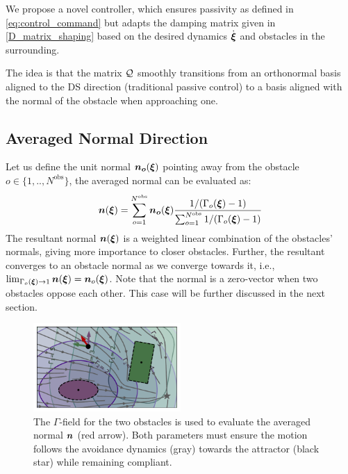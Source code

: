 \documentclass[conference]{IEEEtran}
\begin{document}
We propose a novel controller, which ensures passivity as defined in \eqref{eq:control_command} but adapts the damping matrix given in \eqref{D_matrix_shaping} based on the desired dynamics $\dot{\boldsymbol{\xi}}$ and obstacles in the surrounding. 

The idea is that the matrix $\mathcal{Q}$ smoothly transitions from an orthonormal basis aligned to the DS direction (traditional passive control) to a basis aligned with the normal of the obstacle when approaching one.

\subsection{Averaged Normal Direction} \label{sec:obstacle_normals}
Let us define the unit normal $\boldsymbol{n_o} (\boldsymbol{\xi})$  pointing away from the obstacle $o \in \{1,  ..,  N^{\mathrm{obs}} \}$, the averaged normal can be evaluated as:
\begin{equation}
  \boldsymbol{n}(\boldsymbol{\xi}) = \sum_{o=1}^{N^{\mathrm{obs}}} \boldsymbol{n_o}(\boldsymbol{\xi})
  \frac{1 / (\Gamma_o(\boldsymbol{\xi}) - 1)}{\sum_{o=1}^{N^\mathrm{obs}} 1 / (\Gamma_o(\boldsymbol{\xi}) - 1)}
\end{equation}
The resultant normal $\boldsymbol{n}(\boldsymbol{\xi})$ is a weighted linear combination of the obstacles' normals, giving more importance to closer obstacles.
Further, the resultant converges to an obstacle normal as we converge towards it, i.e., $\lim_{\Gamma_o(\boldsymbol{\xi}) \rightarrow 1} \boldsymbol{n}(\boldsymbol{\xi}) = \boldsymbol{n}_o(\boldsymbol{\xi})$.
Note that the normal is a zero-vector when two obstacles oppose each other. This case will be further discussed in the next section.

\begin{figure}
\centerline{\includegraphics[width=0.5\textwidth]{figures/normal_and_gamma_field_visualization}}
\caption{The $\Gamma$-field for the two obstacles is used to evaluate the averaged normal $\boldsymbol{n}$ (red arrow). 
Both parameters must ensure the motion follows the avoidance dynamics (gray) towards the attractor (black star) while remaining compliant.}
\label{fig:resultant_normal}
\end{figure}
\end{document}
